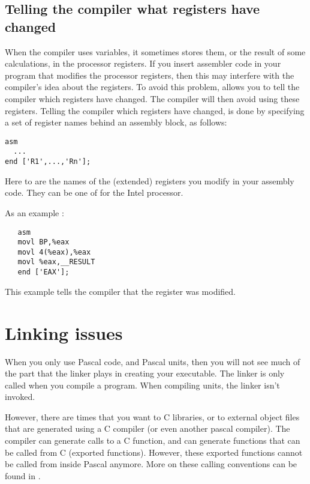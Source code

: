 \documentclass{report}
\begin{document}
\section{Telling the compiler what registers have changed}
\label{se:RegChanges}
When the compiler uses variables, it sometimes stores them, or the result of
some calculations, in the processor registers. If you insert assembler code
in your program that modifies the processor registers, then this may
interfere with the compiler's idea about the registers. To avoid this
problem, \fpc allows you to tell the compiler which registers have changed.
The compiler will then avoid using these registers. Telling the compiler
which registers have changed, is done by specifying a set of register names
behind an assembly block, as follows:
\begin{verbatim}
asm
  ...
end ['R1',...,'Rn'];
\end{verbatim}
Here  to  are the names of the (extended) registers you 
modify in your assembly code. They can be one of  for the Intel processor.

As an example : 
\begin{verbatim}
   asm
   movl BP,%eax
   movl 4(%eax),%eax
   movl %eax,__RESULT
   end ['EAX'];
\end{verbatim} 
This example tells the compiler that the  register was modified.


\chapter{Linking issues}
\label{ch:Linking}
When you only use Pascal code, and Pascal units, then you will not see much
of the part that the linker plays in creating your executable.
The linker is only called when you compile a program. When compiling units,
the linker isn't invoked.

However, there are times that you want to C libraries, or to external 
object files that are generated using a C compiler (or even another pascal
compiler). The \fpc compiler can generate calls to a C function, 
and can generate functions that can be called from C (exported functions). 
However, these exported functions cannot be called from
inside Pascal anymore. More on these calling conventions can be found in
.
\end{document}
